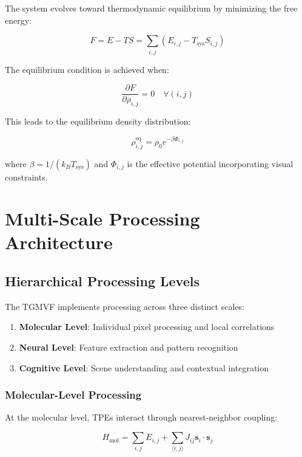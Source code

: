 \documentclass[12pt,a4paper]{article}
\begin{document}
The system evolves toward thermodynamic equilibrium by minimizing the free energy:

\begin{equation}
F = E - TS = \sum_{i,j} (E_{i,j} - T_{\text{sys}}S_{i,j})
\end{equation}

The equilibrium condition is achieved when:

\begin{equation}
\frac{\partial F}{\partial \rho_{i,j}} = 0 \quad \forall (i,j)
\end{equation}

This leads to the equilibrium density distribution:

\begin{equation}
\rho_{i,j}^{\text{eq}} = \rho_0 e^{-\beta \Phi_{i,j}}
\end{equation}

where $\beta = 1/(k_B T_{\text{sys}})$ and $\Phi_{i,j}$ is the effective potential incorporating visual constraints.

\section{Multi-Scale Processing Architecture}

\subsection{Hierarchical Processing Levels}

The TGMVF implements processing across three distinct scales:

\begin{enumerate}
\item \textbf{Molecular Level}: Individual pixel processing and local correlations
\item \textbf{Neural Level}: Feature extraction and pattern recognition
\item \textbf{Cognitive Level}: Scene understanding and contextual integration
\end{enumerate}

\subsubsection{Molecular-Level Processing}

At the molecular level, TPEs interact through nearest-neighbor coupling:

\begin{equation}
H_{\text{mol}} = \sum_{i,j} E_{i,j} + \sum_{\langle i,j \rangle} J_{ij} \mathbf{s}_{i} \cdot \mathbf{s}_{j}
\end{equation}
\end{document}
